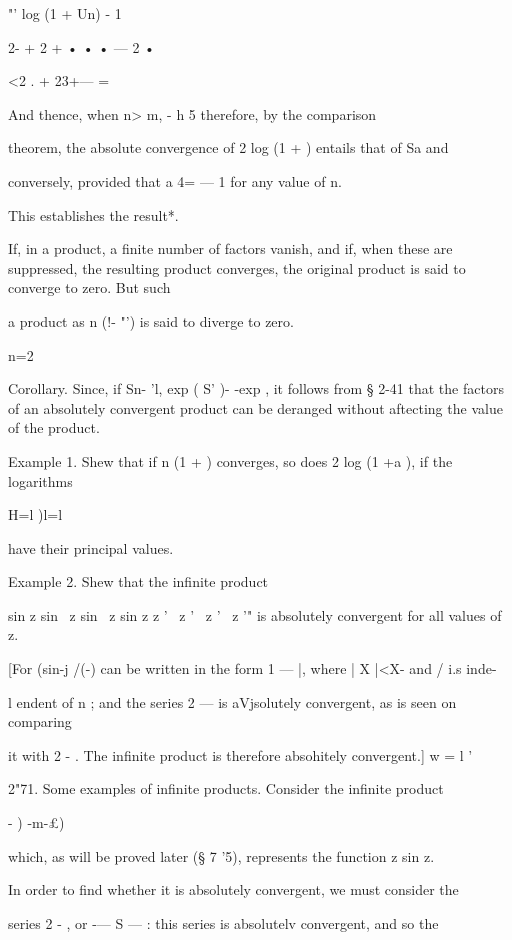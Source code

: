   "' log (1 + Un) - 1



2- + 2 + • • • — 2 •



<2 . + 23+--- =

And thence, when n> m, - h 5 therefore, by the comparison

theorem, the absolute convergence of 2 log (1 + ) entails that of Sa
and

conversely, provided that a 4= — 1 for any value of n.

This establishes the result*.

If, in a product, a finite number of factors vanish, and if, when
these are suppressed, the resulting product converges, the original
product is said to converge to zero. But such

a product as n (!- "') is said to diverge to zero.

n=2

Corollary. Since, if Sn- 'l, exp ( S' )- -exp , it follows from § 2-41
that the factors of an absolutely convergent product can be deranged
without aftecting the value of the product.

Example 1. Shew that if n (1 + ) converges, so does 2 log (1 +a ), if
the logarithms

H=l )l=l

have their principal values.

Example 2. Shew that the infinite product

sin z sin \ z sin \ z sin z z ' \ z ' \ z ' \ z '" is absolutely
convergent for all values of z.

[For (sin-j /(-) can be written in the form 1 — |, where | X |<X- and
/ i.s inde-

l endent of n ; and the series 2 — is aVjsolutely convergent, as is
seen on comparing

it with 2 - . The infinite product is therefore absohitely
convergent.] w = l '

2"71. Some examples of infinite products. Consider the infinite
product



  - ) -m-£)



which, as will be proved later (§ 7 '5), represents the function z sin
z.

In order to find whether it is absolutely convergent, we must consider
the

series 2 - , or -— S — : this series is absolutelv convergent, and so
the

